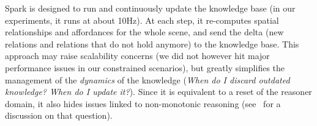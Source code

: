 \documentclass[preprint,3p,times]{elsarticle}
\begin{document}


{\sc Spark} is designed to run and continuously update the knowledge base (in
our experiments, it runs at about 10Hz). At each step, it re-computes spatial
relationships and affordances for the whole scene, and send the delta (new
relations and relations that do not hold anymore) to the knowledge base. This
approach may raise scalability concerns (we did not however hit major
performance issues in our constrained scenarios), but greatly simplifies the
management of the \emph{dynamics} of the knowledge (\emph{When do I discard
outdated knowledge?  When do I update it?}). Since it is equivalent to a reset
of the reasoner domain, it also hides issues linked to non-monotonic reasoning
(see~\cite{McCarthy2007} for a discussion on that question).
\end{document}
